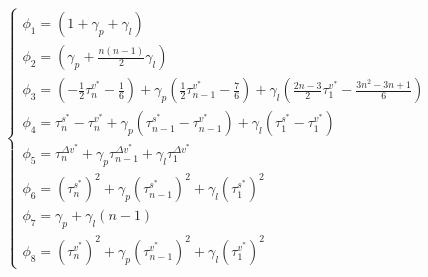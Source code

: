 \documentclass[journal]{IEEEtran}
\begin{document}
\begin{equation}
  \left\{ \begin{array}{l}
    {\phi _1} = \left( {1 + {\gamma _p} + {\gamma _l}} \right)                                                                                                                                                                                          \\
    {\phi _2} = ({\gamma _p} + \frac{{n\left( {n - 1} \right)}}{2}{\gamma _l})                                                                                                                                                                          \\
    {\phi _3} = \left( { - \frac{1}{2}\tau _n^{{v^*}} - \frac{1}{6}} \right) + {\gamma _p}\left( {\frac{1}{2}\tau _{n - 1}^{{v^*}} - \frac{7}{6}} \right) + {\gamma _l}\left( {\frac{{2n - 3}}{2}\tau _1^{{v^*}} - \frac{{3{n^2} - 3n + 1}}{6}} \right) \\
    {\phi _4} = \tau _n^{{s^*}} - \tau _n^{{v^*}} + {\gamma _p}\left( {\tau _{n - 1}^{{s^*}} - \tau _{n - 1}^{{v^*}}} \right) + {\gamma _l}\left( {\tau _1^{{s^*}} - \tau _1^{{v^*}}} \right)                                                           \\
    {\phi _5} = \tau _n^{\Delta {v^*}} + {\gamma _p}\tau _{n - 1}^{\Delta {v^*}} + {\gamma _l}\tau _1^{\Delta {v^*}}                                                                                                                                    \\
    {\phi _6} = {\left( {\tau _n^{{s^*}}} \right)^2} + {\gamma _p}{\left( {\tau _{n - 1}^{{s^*}}} \right)^2} + {\gamma _l}{\left( {\tau _1^{{s^*}}} \right)^2}                                                                                          \\
    {\phi _7} = {\gamma _p} + {\gamma _l}\left( {n - 1} \right)                                                                                                                                                                                         \\
    {\phi _8} = {\left( {\tau _n^{{v^*}}} \right)^2} + {\gamma _p}{\left( {\tau _{n - 1}^{{v^*}}} \right)^2} + {\gamma _l}{\left( {\tau _1^{{v^*}}} \right)^2}
  \end{array} \right.
\end{equation}
\end{document}
